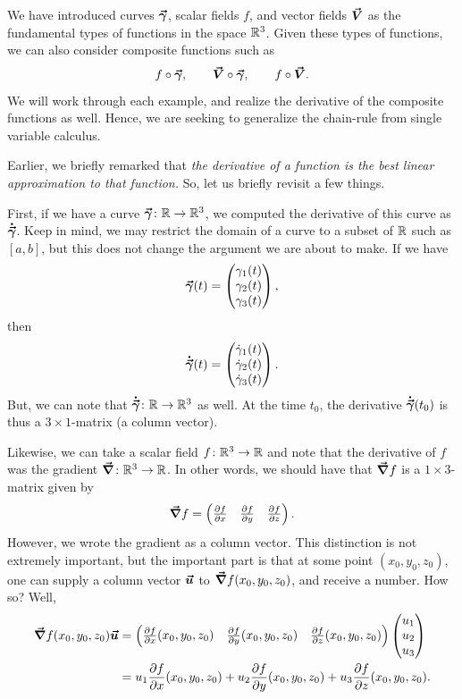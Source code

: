        We have introduced curves $\boldsymbol{\vec{\gamma}}$, scalar fields $f$, and vector fields $\boldsymbol{\vec{V}}$ as the fundamental types of functions in the space $\mathbb{R}^3$.  Given these types of functions, we can also consider composite functions such as
       \[
       f\circ \boldsymbol{\vec{\gamma}}, \qquad \boldsymbol{\vec{V}} \circ \boldsymbol{\vec{\gamma}}, \qquad f \circ \boldsymbol{\vec{V}}.
       \]
     	We will work through each example, and realize the derivative of the composite functions as well. Hence, we are seeking to generalize the chain-rule from single variable calculus.

     	Earlier, we briefly remarked that \emph{the derivative of a function is the best linear approximation to that function.} So, let us briefly revisit a few things.

     	First, if we have a curve $\boldsymbol{\vec{\gamma}} \colon \mathbb{R} \to \mathbb{R}^3$, we computed the derivative of this curve as $\boldsymbol{\dot{\vec{\gamma}}}$. Keep in mind, we may restrict the domain of a curve to a subset of $\mathbb{R}$ such as $[a,b]$, but this does not change the argument we are about to make.  If we have
     	\[
     	\boldsymbol{\vec{\gamma}}(t) = \begin{pmatrix} \gamma_1(t) \\ \gamma_2(t) \\ \gamma_3(t) \end{pmatrix},
     	\]
     	then
     	\[
     	\boldsymbol{\dot{\vec{\gamma}}}(t) = \begin{pmatrix} \dot{\gamma}_1(t) \\ \dot{\gamma}_2(t) \\ \dot{\gamma}_3(t) \end{pmatrix}.
     	\]
     	But, we can note that $\boldsymbol{\dot{\vec{\gamma}}} \colon \mathbb{R} \to \mathbb{R}^3$ as well.  At the time $t_0$, the derivative $\boldsymbol{\dot{\vec{\gamma}}}(t_0)$ is thus a $3\times 1$-matrix (a column vector).

     	Likewise, we can take a scalar field $f\colon \mathbb{R}^3 \to \mathbb{R}$ and note that the derivative of $f$ was the gradient $\boldsymbol{\vec{\nabla}} \colon \mathbb{R}^3 \to \mathbb{R}$.  In other words, we should have that $\boldsymbol{\vec{\nabla}} f$ is a $1\times 3$-matrix given by
     	\[
     	\boldsymbol{\vec{\nabla}} f = \begin{pmatrix} \frac{\partial f}{\partial x} & \frac{\partial f}{\partial y} & \frac{\partial f}{\partial z} \end{pmatrix}.
     	\]
     	However, we wrote the gradient as a column vector.  This distinction is not extremely important, but the important part is that at some point $(x_0,y_0,z_0)$, one can supply a column vector $\boldsymbol{\boldsymbol{\vec{u}}}$ to $\boldsymbol{\vec{\nabla}} f(x_0,y_0,z_0)$, and receive a number. How so? Well,
     	\begin{align*}
     	\boldsymbol{\vec{\nabla}} f(x_0,y_0,z_0) \boldsymbol{\boldsymbol{\vec{u}}} &= \begin{pmatrix} \frac{\partial f}{\partial x}(x_0,y_0,z_0) & \frac{\partial f}{\partial y} (x_0,y_0,z_0) & \frac{\partial f}{\partial z}(x_0,y_0,z_0) \end{pmatrix} \begin{pmatrix} u_1 \\ u_2 \\ u_3 \end{pmatrix}\\
     	&= u_1 \frac{\partial f}{\partial x}(x_0,y_0,z_0)+ u_2 \frac{\partial f}{\partial y}(x_0,y_0,z_0)+ u_3 \frac{\partial f}{\partial z}(x_0,y_0,z_0).
     	\end{align*}

